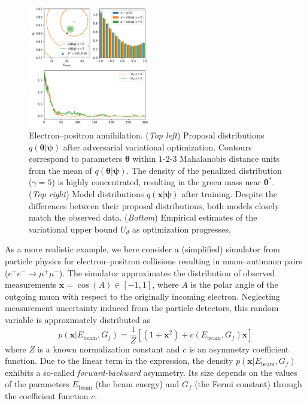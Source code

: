 \documentclass{article}
\newcommand{\qxpsi}{q(\mathbf{x}|\bfpsi)}
\newcommand{\bftheta}{{\bm \theta}}
\newcommand{\bfpsi}{{\bm \psi}}
\theoremstyle{plain}
\begin{document}
\begin{figure}[h]
\centering
\includegraphics[width=0.48\textwidth]{figures/weinberg.pdf}
\caption{Electron--positron annihilation.
({\it Top left}) Proposal distributions $q(\bftheta|\bfpsi)$ after adversarial variational optimization.
         Contours correspond to parameters $\bftheta$ within $1$-$2$-$3$ Mahalanobis distance units from the mean of $q(\bftheta|\bfpsi)$.
         The density of the penalized distribution ($\gamma=5$) is  highly concentrated, resulting in the green mass near $\bftheta^*$.
({\it Top right}) Model distributions $\qxpsi$ after training. Despite the differences between their proposal distributions, both models closely match the observed data.
({\it Bottom}) Empirical estimates of the variational upper bound $U_d$ as optimization progresses.
 }\label{fig:weinberg}
\end{figure}

As a more realistic example, we here consider a (simplified) simulator from
particle physics for electron--positron collisions resulting in muon--antimuon
pairs ($e^+e^- \rightarrow \mu^+\mu^-$). The simulator approximates the
distribution of observed measurements $\mathbf{x} = \cos(A) \in [-1,1]$, where $A$ is the
polar angle of the outgoing muon with respect  to the originally incoming
electron. Neglecting measurement uncertainty induced from the particle detectors,
this random variable is approximately distributed as
\begin{equation}\label{eq:simple_weinberg}
p(\mathbf{x}|E_\text{beam}, G_f) = \frac{1}{Z} \left[ (1 + \mathbf{x}^2) + c(E_\text{beam}, G_f) \mathbf{x} \right]
\end{equation}
where $Z$ is a known normalization constant and $c$ is an asymmetry coefficient
function. Due to the linear term in the expression, the density $p(\mathbf{x} |
E_\text{beam}, G_f)$ exhibits a so-called {\it forward-backward} asymmetry.  Its
size depends on the values of the parameters $E_\text{beam}$ (the beam energy)
and $G_f$ (the Fermi constant) through the coefficient function $c$.
\end{document}
